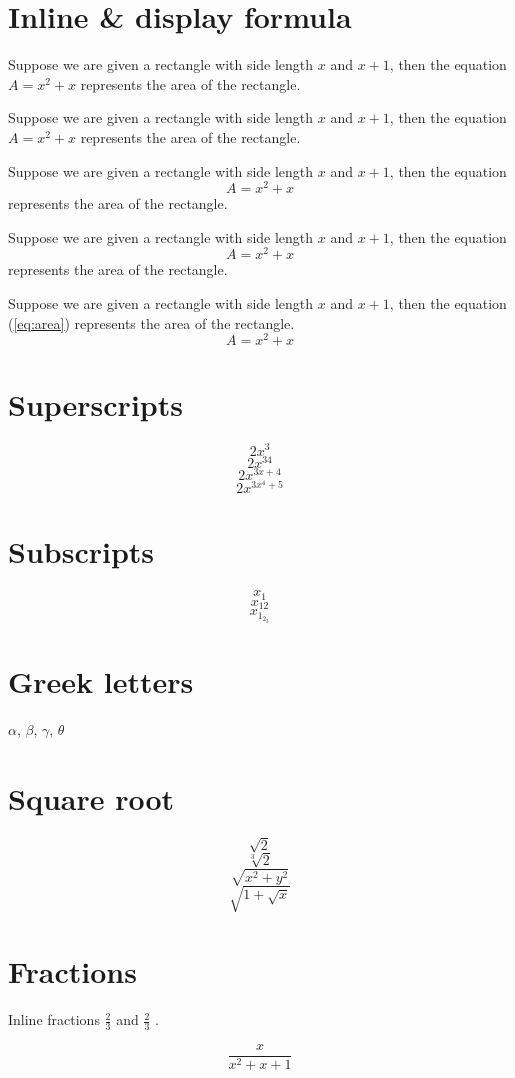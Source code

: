 \documentclass[12pt]{article}
\begin{document}
\section{Inline \& display formula}
Suppose we are given a rectangle with side length $x$ and $x+1$, then the equation $A=x^2+x$ represents the area of the rectangle.

Suppose we are given a rectangle with side length \(x\) and \(x+1\), then the equation \(A=x^2+x\) represents the area of the rectangle.

Suppose we are given a rectangle with side length $x$ and $x+1$, then the equation $$A=x^2+x$$ represents the area of the rectangle.

Suppose we are given a rectangle with side length $x$ and $x+1$, then the equation 
\[
A=x^2+x
\] 
represents the area of the rectangle.

Suppose we are given a rectangle with side length $x$ and $x+1$, then the equation (\ref{eq:area}) represents the area of the rectangle.
\begin{equation}\label{eq:area}
A=x^2+x
\end{equation}


\section{Superscripts}
\[2x^3\]
\[2x^{34}\]
\[2x^{3x+4}\]
\[2x^{3x^4+5}\]

\section{Subscripts}
\[x_1\]
\[x_{12}\]
\[ x_{1_{2_3}}   \]

\section{Greek letters}
$\alpha$, $\beta$, $\gamma$, $\theta$

\section{Square root}
\[\sqrt{2}\]
\[\sqrt[3]{2}\]
\[\sqrt{x^2+y^2}\]
\[\sqrt{1+\sqrt{x}}\]


\section{Fractions}
Inline fractions $\frac{2}{3}$ and $\displaystyle{\frac{2}{3}}$ .

\[\frac{x}{x^2+x+1}\]
\end{document}
